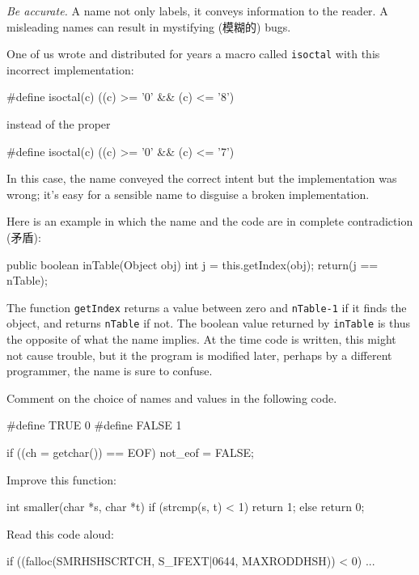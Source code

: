 \emph{Be accurate.} A name not only labels, it conveys information to the
reader. A misleading names can result in mystifying (模糊的) bugs.

One of us wrote and distributed for years a macro called \verb"isoctal"
with this incorrect implementation:
\begin{badcode}
    #define isoctal(c) ((c) >= '0' && (c) <= '8')
\end{badcode}
instead of the proper
\begin{wellcode}
    #define isoctal(c) ((c) >= '0' && (c) <= '7')
\end{wellcode}
In this case, the name conveyed the correct intent but the implementation
was wrong; it's easy for a sensible name to disguise a broken
implementation.

Here is an example in which the name and the code are in complete
contradiction (矛盾):
\begin{badcode}
    public boolean inTable(Object obj) {
        int j = this.getIndex(obj);
        return(j == nTable);
    }
\end{badcode}

The function \verb"getIndex" returns a value between zero and
\verb"nTable-1" if it finds the object, and returns \verb"nTable" if not.
The boolean value returned by \verb"inTable" is thus the opposite of what
the name implies. At the time code is written, this might not cause
trouble, but it the program is modified later, perhaps by a different
programmer, the name is sure to confuse.

\begin{exercise}
Comment on the choice of names and values in the following code.
\begin{badcode}
    #define TRUE    0
    #define FALSE   1

    if ((ch = getchar()) == EOF)
        not_eof = FALSE;
\end{badcode}
\end{exercise}

\begin{exercise}
Improve this function:
\begin{badcode}
    int smaller(char *s, char *t) {
        if (strcmp(s, t) < 1)
            return 1;
        else 
            return 0;
    }
\end{badcode}
\end{exercise}

\begin{exercise}
Read this code aloud:
\begin{badcode}
    if ((falloc(SMRHSHSCRTCH, S_IFEXT|0644, MAXRODDHSH)) < 0)
        ...
\end{badcode}
\end{exercise}

